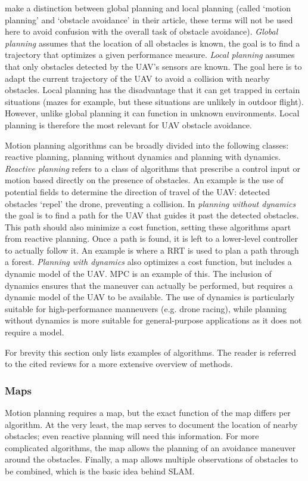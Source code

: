 \citeauthor{Minguez2016} \cite{Minguez2016} make a distinction between global planning and local planning (called `motion planning' and `obstacle avoidance' in their article, these terms will not be used here to avoid confusion with the overall task of obstacle avoidance).
\emph{Global planning} assumes that the location of all obstacles is known, the goal is to find a trajectory that optimizes a given performance measure.
\emph{Local planning} assumes that only obstacles detected by the \ac{UAV}'s sensors are known.
The goal here is to adapt the current trajectory of the \ac{UAV} to avoid a collision with nearby obstacles.
Local planning has the disadvantage that it can get trapped in certain situations (mazes for example, but these situations are unlikely in outdoor flight).
However, unlike global planning it can function in unknown environments.
Local planning is therefore the most relevant for \ac{UAV} obstacle avoidance.

Motion planning algorithms can be broadly divided into the following classes: reactive planning, planning without dynamics and planning with dynamics.
\emph{Reactive planning} refers to a class of algorithms that prescribe a control input or motion based directly on the presence of obstacles.
An example is the use of potential fields to determine the direction of travel of the \ac{UAV}: detected obstacles `repel' the drone, preventing a collision.
In \emph{planning without dynamics} the goal is to find a path for the \ac{UAV} that guides it past the detected obstacles.
This path should also minimize a cost function, setting these algorithms apart from reactive planning.
Once a path is found, it is left to a lower-level controller to actually follow it.
An example is \cite{Matthies2014} where a \ac{RRT} is used to plan a path through a forest.
\emph{Planning with dynamics} also optimizes a cost function, but includes a dynamic model of the \ac{UAV}.
\ac{MPC} is an example of this.
The inclusion of dynamics ensures that the maneuver can actually be performed, but requires a dynamic model of the \ac{UAV} to be available.
The use of dynamics is particularly suitable for high-performance manneuvers (e.g. drone racing), while planning without dynamics is more suitable for general-purpose applications as it does not require a model.

For brevity this section only lists examples of algorithms.
The reader is referred to the cited reviews for a more extensive overview of methods.



\subsubsection{Maps}
\label{sec:maps}
Motion planning requires a map, but the exact function of the map differs per algorithm.
At the very least, the map serves to document the location of nearby obstacles; even reactive planning will need this information.
For more complicated algorithms, the map allows the planning of an avoidance maneuver around the obstacles.
Finally, a map allows multiple observations of obstacles to be combined, which is the basic idea behind \ac{SLAM}.

